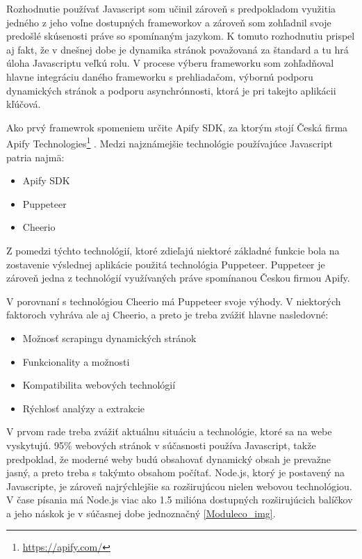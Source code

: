 \bigskip

Rozhodnutie používať Javascript som učinil zároveň s predpokladom využitia jedného z jeho voľne dostupných frameworkov a zároveň som zohľadnil svoje predošlé skúsenosti práve so spomínaným jazykom. K tomuto rozhodnutiu prispel aj fakt, že v dnešnej dobe je dynamika stránok považovaná za štandard a tu hrá úloha Javascriptu veľkú rolu. V procese výberu frameworku som zohľadňoval hlavne integráciu daného frameworku s prehliadačom, výbornú podporu dynamických stránok a podporu asynchrónnosti, ktorá je pri takejto aplikácii kľúčová.

Ako prvý framewrok spomeniem určite Apify SDK, za ktorým stojí Česká firma Apify Technologies\footnote{{\url{https://apify.com/}}} \cite{JanCurna:online}. Medzi najznámejšie technológie používajúce Javascript patria najmä:

\begin{itemize}
    \item {Apify SDK}
    \item {Puppeteer}
    \item {Cheerio}
\end{itemize}

Z pomedzi týchto technológií, ktoré zdieľajú niektoré základné funkcie bola na zostavenie výslednej aplikácie použitá technológia Puppeteer. Puppeteer je zároveň jedna z technológií využívaných práve spomínanou Českou firmou Apify. 

V porovnaní s technológiou Cheerio má Puppeteer svoje výhody. V niektorých faktoroch vyhráva ale aj Cheerio, a preto je treba zvážiť hlavne nasledovné:

\begin{itemize}
    \item {Možnosť scrapingu dynamických stránok}
    \item {Funkcionality a možnosti}
    \item {Kompatibilita webových technológií}
    \item {Rýchlosť analýzy a extrakcie}
\end{itemize}

V prvom rade treba zvážiť aktuálnu situáciu a technológie, ktoré sa na webe vyskytujú. 95\% webových stránok v súčasnosti používa Javascript, takže predpoklad, že moderné weby budú obsahovať dynamický obsah je prevažne jasný, a preto treba s takýmto obsahom počítať. Node.js, ktorý je postavený na Javascripte, je zároveň najrýchlejšie sa rozširujúcou nielen webovou technológiou. V čase písania má Node.js viac ako 1.5 milióna dostupných rozširujúcich balíčkov a jeho náskok je v súčasnej dobe jednoznačný \ref{Moduleco_img}\cite{HowPopular}. 

